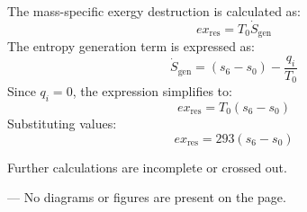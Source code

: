 The mass-specific exergy destruction is calculated as:  
\[
ex_{\text{res}} = T_0 \dot{S}_{\text{gen}}
\]  
The entropy generation term is expressed as:  
\[
\dot{S}_{\text{gen}} = (s_6 - s_0) - \frac{q_i}{T_0}
\]  
Since \( q_i = 0 \), the expression simplifies to:  
\[
ex_{\text{res}} = T_0 (s_6 - s_0)
\]  
Substituting values:  
\[
ex_{\text{res}} = 293 (s_6 - s_0)
\]  

Further calculations are incomplete or crossed out.  

---  
No diagrams or figures are present on the page.